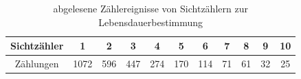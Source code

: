 \begin{table}[h]
    \centering
    \caption{abgelesene Zählereignisse von Sichtzählern zur Lebensdauerbestimmung}
    \label{tab:sichtzaehler}
    \begin{tabular}{c | c c c c c c c c c c}
      Sichtzähler &1&2&3&4&5&6&7&8&9&10\\ \hline
      Zählungen &1072&596&447&274&170&114&71&61&32&25\\
    \end{tabular}
  \end{table}
